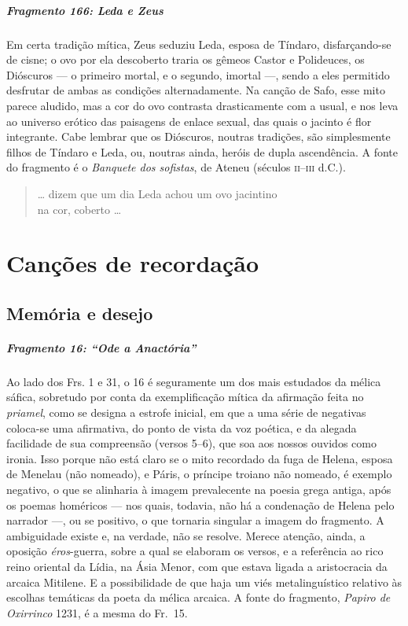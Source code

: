 \paragraph{Fragmento 166: Leda e Zeus}

{\small Em certa tradição mítica, Zeus seduziu Leda, esposa de Tíndaro, disfarçando-se
de cisne; o ovo por ela descoberto traria os gêmeos Castor e Polideuces, os
Dióscuros --- o primeiro mortal, e o segundo, imortal ---, sendo a eles
permitido desfrutar de ambas as condições alternadamente. Na canção de Safo,
esse mito parece aludido, mas a cor do ovo contrasta drasticamente com a usual,
e nos leva ao universo erótico das paisagens de enlace sexual, das quais o
jacinto é flor integrante. Cabe lembrar que os Dióscuros, noutras tradições,
são simplesmente filhos de Tíndaro e Leda, ou, noutras ainda, heróis de dupla
ascendência. A fonte do fragmento é o \textit{Banquete dos sofistas}, de Ateneu
(séculos \textsc{ii}--\textsc{iii} d.C.).}

\begin{verse}
\ldots{} dizem que um dia Leda achou um ovo \qb{}jacintino\\
na cor, coberto \ldots{}
\end{verse}


\chapter{Canções de recordação}

\section{Memória e desejo}

\paragraph{Fragmento 16: ``Ode a Anactória''}

{\small Ao lado dos Frs. 1 e 31, o 16 é seguramente um dos mais estudados da mélica
sáfica, sobretudo por conta da exemplificação mítica da afirmação feita no
\textit{priamel}, como se designa a estrofe inicial, em que a uma série de
negativas coloca-se uma afirmativa, do ponto de vista da voz poética, e da
alegada facilidade de sua compreensão (versos 5--6), que soa aos nossos ouvidos
como ironia. Isso porque não está claro se o mito recordado da fuga de Helena, esposa 
de Menelau (não nomeado), e Páris, o príncipe troiano não nomeado, é exemplo
negativo, o que se alinharia à imagem prevalecente na poesia grega antiga, após
os poemas homéricos --- nos quais, todavia, não há a condenação de Helena pelo
narrador ---, ou se positivo, o que tornaria singular a imagem do fragmento. A
ambiguidade existe e, na verdade, não se resolve. Merece atenção, ainda, a
oposição \textit{éros}{}-guerra, sobre a qual se elaboram os versos, e a
referência ao rico reino oriental da Lídia, na Ásia Menor, com que estava
ligada a aristocracia da arcaica Mitilene. E a possibilidade de que haja um
viés metalinguístico relativo às escolhas temáticas da poeta da mélica arcaica.
A fonte do fragmento, \textit{Papiro de Oxirrinco} 1231, é a mesma do Fr.~15.}

